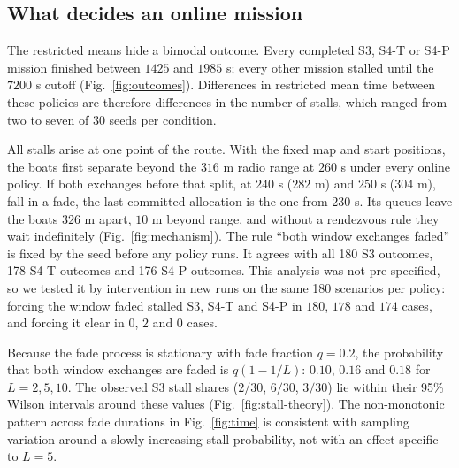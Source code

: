 

\subsection{What decides an online mission}\label{sec:critical}
The restricted means hide a bimodal outcome. Every completed S3, S4-T or S4-P mission finished between $1425$ and $1985$ s; every other mission stalled until the $7200$ s cutoff (Fig.~\ref{fig:outcomes}). Differences in restricted mean time between these policies are therefore differences in the number of stalls, which ranged from two to seven of 30 seeds per condition.

All stalls arise at one point of the route. With the fixed map and start positions, the boats first separate beyond the $316$ m radio range at $260$ s under every online policy. If both exchanges before that split, at $240$ s ($282$ m) and $250$ s ($304$ m), fall in a fade, the last committed allocation is the one from $230$ s. Its queues leave the boats $326$ m apart, $10$ m beyond range, and without a rendezvous rule they wait indefinitely (Fig.~\ref{fig:mechanism}). The rule ``both window exchanges faded'' is fixed by the seed before any policy runs. It agrees with all 180 S3 outcomes, 178 S4-T outcomes and 176 S4-P outcomes. This analysis was not pre-specified, so we tested it by intervention in new runs on the same 180 scenarios per policy: forcing the window faded stalled S3, S4-T and S4-P in $180$, $178$ and $174$ cases, and forcing it clear in $0$, $2$ and $0$ cases.

Because the fade process is stationary with fade fraction $q=0.2$, the probability that both window exchanges are faded is $q(1-1/L)$: $0.10$, $0.16$ and $0.18$ for $L=2,5,10$. The observed S3 stall shares ($2/30$, $6/30$, $3/30$) lie within their 95\% Wilson intervals around these values (Fig.~\ref{fig:stall-theory}). The non-monotonic pattern across fade durations in Fig.~\ref{fig:time} is consistent with sampling variation around a slowly increasing stall probability, not with an effect specific to $L=5$.

